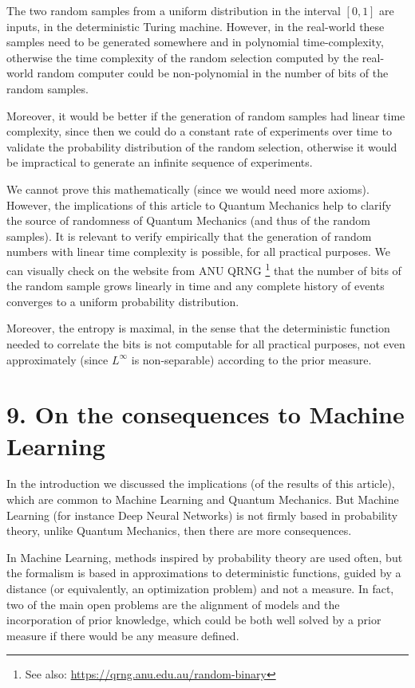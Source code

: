 \documentclass[11pt,a4paper]{report}
\begin{document}
The two random samples from a uniform distribution in the interval
\([0,1]\) are inputs, in the deterministic Turing machine. However, in
the real-world these samples need to be generated somewhere and in
polynomial time-complexity, otherwise the time complexity of the random
selection computed by the real-world random computer could be
non-polynomial in the number of bits of the random samples.

Moreover, it would be better if the generation of random samples had
linear time complexity, since then we could do a constant rate of
experiments over time to validate the probability distribution of the
random selection, otherwise it would be impractical to generate an
infinite sequence of experiments.

We cannot prove this mathematically (since we would need more axioms).
However, the implications of this article to Quantum Mechanics help to
clarify the source of randomness of Quantum Mechanics (and thus of the
random samples). It is relevant to verify empirically that the
generation of random numbers with linear time complexity is possible,
for all practical purposes. We can visually check on the website from
ANU QRNG \footnote{See also: \url{https://qrng.anu.edu.au/random-binary}}
that the number of bits of the random sample grows linearly in time and
any complete history of events converges to a uniform probability
distribution.

Moreover, the entropy is maximal, in the sense that the deterministic
function needed to correlate the bits is not computable for all
practical purposes, not even approximately (since \(L^\infty\) is
non-separable) according to the prior measure.

\hypertarget{on-the-consequences-to-machine-learning}{%
\section{9. On the consequences to Machine
Learning}\label{on-the-consequences-to-machine-learning}}

In the introduction we discussed the implications (of the results of
this article), which are common to Machine Learning and Quantum
Mechanics. But Machine Learning (for instance Deep Neural Networks) is
not firmly based in probability theory, unlike Quantum Mechanics, then
there are more consequences.

In Machine Learning, methods inspired by probability theory are used
often\cite{hennig2022probabilistic}, but the formalism is based in approximations to
deterministic functions, guided by a distance (or equivalently, an
optimization problem) and not a measure. In fact, two of the main open
problems are the alignment of models and the incorporation of prior
knowledge\cite{muller2022transformers}, which could be both well solved by a prior measure if there
would be any measure defined.
\end{document}
